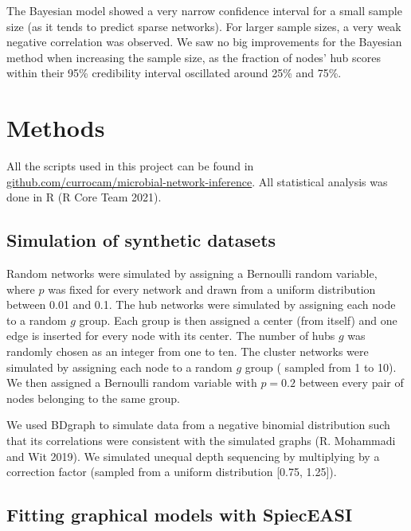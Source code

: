 \documentclass[
  a4paper,
]{article}
\begin{document}
The Bayesian model showed a very narrow confidence interval for a small
sample size (as it tends to predict sparse networks). For larger sample
sizes, a very weak negative correlation was observed. We saw no big
improvements for the Bayesian method when increasing the sample size, as
the fraction of nodes' hub scores within their 95\% credibility interval
oscillated around 25\% and 75\%.

\hypertarget{methods}{%
\section{Methods}\label{methods}}

All the scripts used in this project can be found in
\href{https://github.com/currocam/microbial-network-inference}{github.com/currocam/microbial-network-inference}.
All statistical analysis was done in R (R Core Team 2021).

\hypertarget{simulation-of-synthetic-datasets-1}{%
\subsection{Simulation of synthetic
datasets}\label{simulation-of-synthetic-datasets-1}}

Random networks were simulated by assigning a Bernoulli random variable,
where \(p\) was fixed for every network and drawn from a uniform
distribution between 0.01 and 0.1. The hub networks were simulated by
assigning each node to a random \(g\) group. Each group is then assigned
a center (from itself) and one edge is inserted for every node with its
center. The number of hubs \(g\) was randomly chosen as an integer from
one to ten. The cluster networks were simulated by assigning each node
to a random \(g\) group ( sampled from 1 to 10). We then assigned a
Bernoulli random variable with \(p=0.2\) between every pair of nodes
belonging to the same group.

We used BDgraph to simulate data from a negative binomial distribution
such that its correlations were consistent with the simulated graphs (R.
Mohammadi and Wit 2019). We simulated unequal depth sequencing by
multiplying by a correction factor (sampled from a uniform distribution
{[}0.75, 1.25{]}).

\hypertarget{fitting-graphical-models-with-spieceasi}{%
\subsection{Fitting graphical models with
SpiecEASI}\label{fitting-graphical-models-with-spieceasi}}
\end{document}
